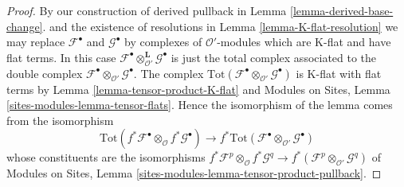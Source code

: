 \documentclass[10pt,a4paper]{amsart}
\theoremstyle{plain}
\theoremstyle{definition}
\theoremstyle{remark}
\numberwithin{equation}{subsection}
\begin{document}
\begin{proof}
By our construction of derived pullback in
Lemma \ref{lemma-derived-base-change}.
and the existence of resolutions in
Lemma \ref{lemma-K-flat-resolution}
we may replace $\mathcal{F}^\bullet$ and $\mathcal{G}^\bullet$
by complexes of $\mathcal{O}'$-modules which are K-flat and have
flat terms. In this case
$\mathcal{F}^\bullet \otimes_{\mathcal{O}'}^{\mathbf{L}} \mathcal{G}^\bullet$
is just the total complex associated to the double complex
$\mathcal{F}^\bullet \otimes_{\mathcal{O}'} \mathcal{G}^\bullet$.
The complex
$\text{Tot}(\mathcal{F}^\bullet \otimes_{\mathcal{O}'} \mathcal{G}^\bullet)$
is K-flat with flat terms by Lemma \ref{lemma-tensor-product-K-flat} and
Modules on Sites, Lemma \ref{sites-modules-lemma-tensor-flats}.
Hence the isomorphism of the lemma comes from the isomorphism
$$
\text{Tot}(f^*\mathcal{F}^\bullet \otimes_{\mathcal{O}}
f^*\mathcal{G}^\bullet)
\longrightarrow
f^*\text{Tot}(\mathcal{F}^\bullet \otimes_{\mathcal{O}'} \mathcal{G}^\bullet)
$$
whose constituents are the isomorphisms
$f^*\mathcal{F}^p \otimes_{\mathcal{O}} f^*\mathcal{G}^q \to
f^*(\mathcal{F}^p \otimes_{\mathcal{O}'} \mathcal{G}^q)$ of
Modules on Sites, Lemma \ref{sites-modules-lemma-tensor-product-pullback}.
\end{proof}
\end{document}
